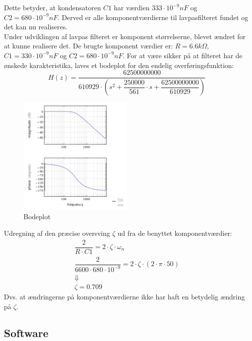 Dette betyder, at kondensatoren $ C1 $ har værdien $ 333\cdot 10^{-9} nF $  og  $ C2 = 680\cdot 10^{-9} nF$. Derved er alle komponentværdierne til lavpasfilteret fundet og det kan nu realiseres. \\ 
\newline
Under udviklingen af lavpas filteret er komponent størrelserne, blevet ændret for at kunne realisere det. De brugte komponent værdier er: $ R= 6.6 k\Omega $, $ C1= 330\cdot 10 ^{-9} nF$ og $ C2= 680\cdot 10^{-9} nF$.   
For at være sikker på at filteret har de ønskede karakteristika, laves et bodeplot for den endelig overføringsfunktion: 
\begin{equation}
H(z)=\dfrac{62500000000}{610929\cdot \left( s^2+\dfrac{250000}{561}\cdot s + \dfrac{62500000000}{610929} \right)}
\end{equation}
\begin{figure}[H]
	\centering
	\includegraphics[width=0.5\textwidth]{Figurer/Bodeplot}
	\caption{Bodeplot}
	\label{fig:bodeplot}
\end{figure}
Udregning af den præcise oversving $ \zeta $ ud fra de benyttet komponentværdier: 
\begin{equation}
\begin{split}
\dfrac{2}{R\cdot C1}= 2\cdot \zeta\cdot \omega_n\\
\dfrac{2}{6600\cdot 680\cdot 10^{-9}}= 2\cdot \zeta\cdot (2\cdot \pi \cdot 50)\\
\Downarrow\\
\zeta = 0.709
\end{split}
\end{equation}
Dvs. at ændringerne på komponentværdierne ikke har haft en betydelig ændring på $ \zeta $. 
\subsection{Software}

